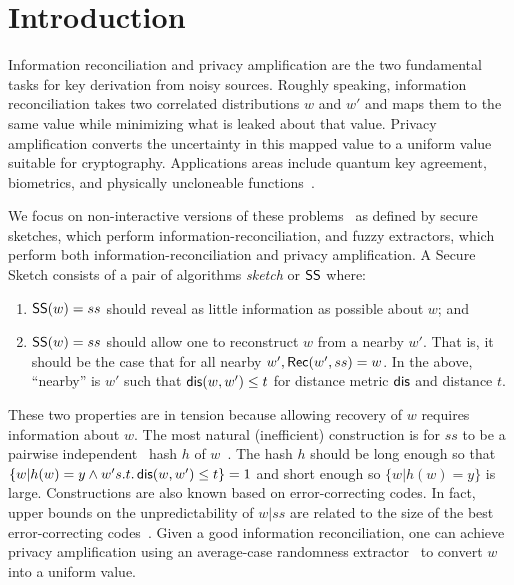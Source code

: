 
\section{Introduction}
Information reconciliation and privacy amplification are the two
fundamental tasks for key derivation from noisy sources.  Roughly
speaking, information reconciliation takes two correlated
distributions $w$ and $w'$ and maps them to the same value while
minimizing what is leaked about that value.  Privacy amplification
converts the uncertainty in this mapped value to a uniform value
suitable for cryptography.  Applications areas include quantum key
agreement, biometrics, and physically uncloneable
functions~\cite{bennett1988privacy,dodis2008fuzzy}.

We focus on non-interactive versions of these problems~\cite{dodis2008fuzzy} as defined by secure sketches, which perform information-recon\-ciliation, and fuzzy extractors, which perform both information-recon\-ciliation and privacy amplification. A Secure Sketch consists of a pair of algorithms \emph{sketch} or ${\mathsf{SS}}$ where:
\begin{enumerate}
\item ${\mathsf{SS}}(w) = ss$ should reveal as little information as possible about $w$; and
\item ${\mathsf{SS}}(w) =ss$ should allow one to reconstruct $w$ from a nearby $w'$. That is, it should be the case that for all nearby $w', {\mathsf{Rec}}(w', ss) = w$.  In the above, ``nearby'' is $w'$ such that $\mathsf{dis}(w,w')\le t$ for  distance metric $\mathsf{dis}$ and distance $t$.
\end{enumerate}
These two properties are in tension because allowing recovery of $w$ requires information about $w$.  The most natural (inefficient) construction is for $ss$ to be a pairwise independent~\cite{carter1977universal} hash $h$ of $w$~\cite{skoric2009efficient,fuller2016fuzzy,woodage2017new,fuller2020fuzzy}. The hash $h$ should be long enough so that $\{w | h(w) = y \wedge w' s.t.\,\mathsf{dis}(w, w')\le t\} =1$ and short enough so $\{w| h(w) = y\}$ is large. Constructions are also known based on error-correcting codes.  In fact, upper bounds on the unpredictability of $w | ss$ are related to the size of the best error-correcting codes~\cite{dodis2008fuzzy,fuller2020computational}. 
Given a good information reconciliation, one can achieve privacy amplification using an average-case randomness extractor~\cite{nisan1993randomness} to convert $w$ into a uniform value.

